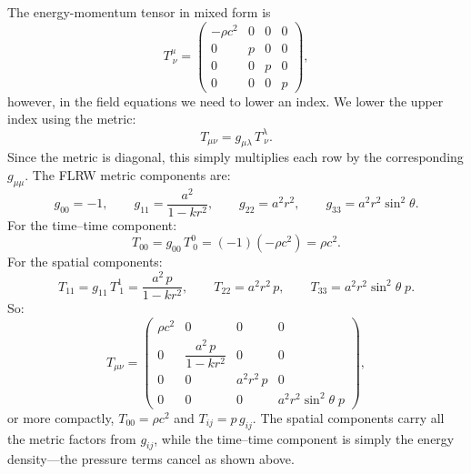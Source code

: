 The energy-momentum tensor in mixed form is
\begin{equation}
    T^{\mu}_{\ \nu} =
    \begin{pmatrix}
    -\rho c^{2} & 0 & 0 & 0 \\
    0 & p & 0 & 0 \\
    0 & 0 & p & 0 \\
    0 & 0 & 0 & p
    \end{pmatrix},
\end{equation}
however, in the field equations we need to lower an index. We lower the upper index using the metric:
\begin{equation}
    T_{\mu\nu} = g_{\mu\lambda}\,T^{\lambda}_{\ \nu}.
\end{equation}
Since the metric is diagonal, this simply multiplies each row by the corresponding $g_{\mu\mu}$. The FLRW metric components are:
\begin{equation}
    g_{00} = -1, \qquad
    g_{11} = \frac{a^{2}}{1-kr^{2}}, \qquad
    g_{22} = a^{2}r^{2}, \qquad
    g_{33} = a^{2}r^{2}\sin^{2}\!\theta.
\end{equation}
For the time--time component:
\begin{equation}
    T_{00} = g_{00}\,T^{0}_{\ 0} = (-1)(-\rho c^{2}) = \rho c^{2}.
\end{equation}
For the spatial components:
\begin{equation}
    T_{11} = g_{11}\,T^{1}_{\ 1} = \frac{a^{2}\,p}{1-kr^{2}}, \qquad
    T_{22} = a^{2}r^{2}\,p, \qquad
    T_{33} = a^{2}r^{2}\sin^{2}\!\theta\;p.
\end{equation}
So:
\begin{equation}
    T_{\mu\nu} =
    \begin{pmatrix}
    \rho c^{2} & 0 & 0 & 0 \\[6pt]
    0 & \dfrac{a^{2}\,p}{1-kr^{2}} & 0 & 0 \\[6pt]
    0 & 0 & a^{2}r^{2}\,p & 0 \\[6pt]
    0 & 0 & 0 & a^{2}r^{2}\sin^{2}\!\theta\;p
    \end{pmatrix},
\end{equation}
or more compactly, $T_{00} = \rho c^{2}$ and $T_{ij} = p\,g_{ij}$. The spatial components carry all the metric factors from $g_{ij}$, while the time--time component is simply the energy density---the pressure terms cancel as shown above.


